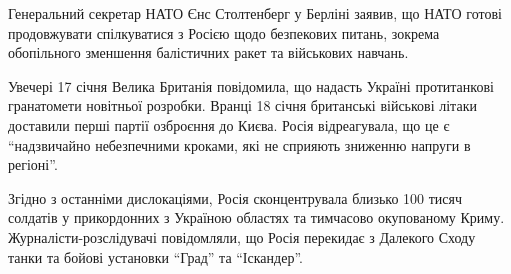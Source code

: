 Генеральний секретар НАТО Єнс Столтенберг у Берліні заявив, що НАТО готові
продовжувати спілкуватися з Росією щодо безпекових питань, зокрема
обопільного зменшення балістичних ракет та військових навчань.

Увечері 17 січня Велика Британія повідомила, що надасть Україні
протитанкові гранатомети новітньої розробки. Вранці 18 січня британські
військові літаки доставили перші партії озброєння до Києва. Росія
відреагувала, що це є \enquote{надзвичайно небезпечними кроками, які не сприяють
зниженню напруги в регіоні}.

Згідно з останніми дислокаціями, Росія сконцентрувала близько 100 тисяч
солдатів у прикордонних з Україною областях та тимчасово окупованому Криму.
Журналісти-розслідувачі повідомляли, що Росія перекидає з Далекого Сходу
танки та бойові установки \enquote{Град} та \enquote{Іскандер}.



